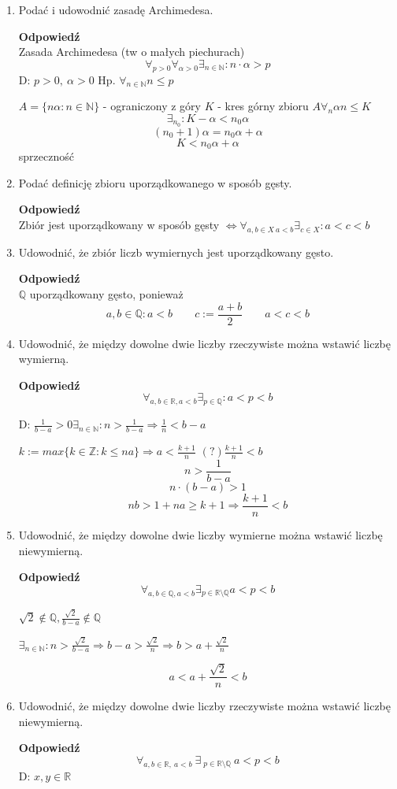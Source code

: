 \documentclass[12pt,a4paper]{article}
\theoremstyle{break}
\newcommand{\Odp}[1]{
		\begin{mdframed}[style=zadanie]
			\textbf{Odpowiedź}\\
			#1
		\end{mdframed}
	}
\newcommand{\witw}{$\Leftrightarrow$}
\begin{document}
\begin{enumerate}[1.]
	\item Podać i udowodnić zasadę Archimedesa.
	\Odp{
		Zasada Archimedesa (tw o małych piechurach)
		$$\forall_{p>0} \forall_{\alpha>0} \exists_{n\in\mathbb{N}} : n\cdot\alpha>p$$
		D: $p>0, \: \alpha>0$
		Hp. $\forall_{n\in\mathbb{N}} n\leq p$
		
		$A=\{n\alpha : n\in\mathbb{N}\}$ - ograniczony z góry
		$K$ - kres górny zbioru $A \forall_n \alpha n \leq K$
		$$\exists_{n_0}: K-\alpha < n_0\alpha$$
		$$(n_0+1)\alpha = n_0\alpha + \alpha$$
		$$K<n_0\alpha + \alpha$$ sprzeczność
	}
	
	\item Podać definicję zbioru uporządkowanego w sposób gęsty.
	\Odp{
		Zbiór jest uporządkowany w sposób gęsty \witw $\forall_{a,b\in X \: a<b} \exists_{c\in X}: a<c<b$
	}
	
	\item Udowodnić, że zbiór liczb wymiernych jest uporządkowany gęsto.
	\Odp{
		$\mathbb{Q}$ uporządkowany gęsto, ponieważ
		$$a,b\in\mathbb{Q}: a<b \qquad c:= \frac{a+b}{2} \qquad a<c<b$$
	}
	
	\item Udowodnić, że między dowolne dwie liczby rzeczywiste można wstawić liczbę wymierną.
	\Odp{
		$$\forall_{a,b\in \mathbb{R}, a<b}\exists_{p\in\mathbb{Q}}: a<p<b$$
		
		D: $\frac{1}{b-a}>0 \exists_{n\in\mathbb{N}}: n>\frac{1}{b-a} \Rightarrow \frac{1}{n}<b-a$
		
		$k:=max\{k\in\mathbb{Z}: k\leq na\} \Rightarrow a<\frac{k+1}{n}$
		$(?) \frac{k+1}{n}<b$
		$$n>\frac{1}{b-a}$$
		$$n\cdot(b-a)>1$$
		$$nb>1+na\geq k+1 \Rightarrow \frac{k+1}{n}<b$$
		 
	}
	
	\item Udowodnić, że między dowolne dwie liczby wymierne można wstawić liczbę niewymierną.
	\Odp{
		$$\forall_{a,b\in \mathbb{Q}, a<b} \exists_{p\in \mathbb{R}\setminus\mathbb{Q}} a<p<b$$
		
		$\sqrt{2}\notin\mathbb{Q}, \frac{\sqrt{2}}{b-a}\notin\mathbb{Q}$
		
		$\exists_{n\in\mathbb{N}}: n>\frac{\sqrt{2}}{b-a}\Rightarrow b-a > \frac{\sqrt{2}}{n} \Rightarrow b>a+\frac{\sqrt{2}}{n}$
		
		$$a<a+\frac{\sqrt{2}}{n}<b$$
	}
	
	\item Udowodnić, że między dowolne dwie liczby rzeczywiste można wstawić liczbę niewymierną.
	\Odp{
		$$\forall_{a,b\in \mathbb{R},\: a<b} \:\exists\:_{p\in \mathbb{R}\setminus\mathbb{Q}} \:a<p<b$$
		D: $x,y\in\mathbb{R}$
		
}
\end{enumerate}
\end{document}
